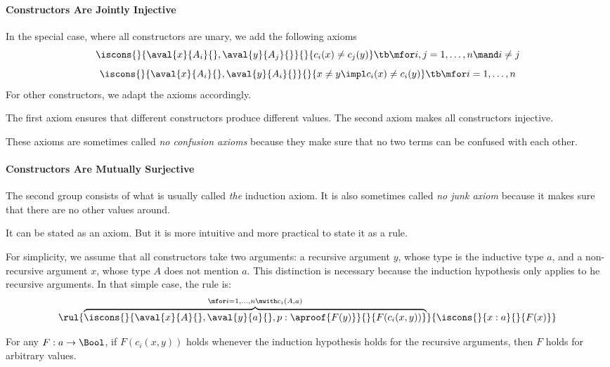 \paragraph{Constructors Are Jointly Injective}
In the special case, where all constructors are unary, we add the following axioms
 \[\iscons{}{\aval{x}{A_i}{},\aval{y}{A_j}{}}{}{c_i(x)\neq c_j(y)} \tb\mfor i,j= 1,\ldots,n\mand i\neq j\]
 \[\iscons{}{\aval{x}{A_i}{},\aval{y}{A_i}{}}{}{x\neq y\impl c_i(x)\neq c_i(y)} \tb \mfor i=1,\ldots,n\] 
For other constructors, we adapt the axioms accordingly.

The first axiom ensures that different constructors produce different values.
The second axiom makes all constructors injective.

These axioms are sometimes called \emph{no confusion axioms} because they make sure that no two terms can be confused with each other.

\paragraph{Constructors Are Mutually Surjective}
The second group consists of what is usually called \emph{the} induction axiom.
It is also sometimes called \emph{no junk axiom} because it makes sure that there are no other values around.

It can be stated as an axiom.
But it is more intuitive and more practical to state it as a rule.

For simplicity, we assume that all constructors take two arguments: a recursive argument $y$, whose type is the inductive type $a$, and a non-recursive argument $x$, whose type $A$ does not mention $a$.
This distinction is necessary because the induction hypothesis only applies to he recursive arguments.
In that simple case, the rule is:
\[
\rul{\overbrace{\iscons{}{\aval{x}{A}{},\aval{y}{a}{}, p: \aproof{F(y)}}{}{F(c_i(x,y))}}^{\mfor i=1,\ldots,n\mwith c_i(A,a)}}
    {\iscons{}{x:a}{}{F(x)}}
\]

For any $F:a\to\Bool$, if $F(c_i(x,y))$ holds whenever the induction hypothesis holds for the recursive arguments, then $F$ holds for arbitrary values.


